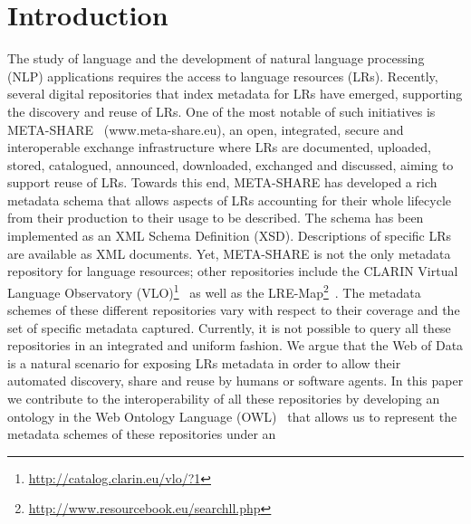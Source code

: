 \documentclass{llncs}
\begin{document}
\section{Introduction}
\label{sec:introduction}
The study of language and the development of natural language processing (NLP) applications requires the access to language resources (LRs). %
Recently, several digital repositories that index metadata for LRs have emerged,
supporting the discovery and reuse of LRs. One of the most notable of such
initiatives is META-SHARE~\cite{piperidis2012meta} (www.meta-share.eu), an open,
integrated, secure and interoperable exchange infrastructure where LRs are
documented, uploaded, stored, catalogued, announced, downloaded, exchanged and
discussed, aiming to support reuse of LRs. Towards this end, META-SHARE has
developed a rich metadata schema that allows aspects of LRs accounting for their
whole lifecycle from their production to their usage to be described. The schema has been implemented as an XML Schema Definition (XSD). Descriptions of specific LRs are available as XML documents.
Yet, META-SHARE is not the only metadata repository for language resources;
other repositories include the CLARIN Virtual Language Observatory
(VLO)\footnote{\url{http://catalog.clarin.eu/vlo/?1}}~\cite{broeder2010data} as
well as the LRE-Map\footnote{\url{http://www.resourcebook.eu/searchll.php}}~\cite{calzolari2012lre}. The metadata schemes of these different repositories vary with respect to their coverage and the set of specific metadata captured.
Currently, it is not possible to query all these repositories in an integrated and uniform fashion.
We argue that the Web of Data is a natural scenario for exposing LRs metadata in order to allow their automated discovery, share and reuse by humans or software agents. %
In this paper we contribute to the interoperability of all these repositories by
developing an ontology in the Web Ontology Language (OWL)~\cite{motik2012owl}
that allows us to represent the metadata schemes of these repositories under an
\end{document}
